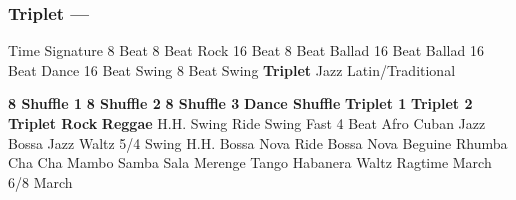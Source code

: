 \subsubsection[Triplet]{Triplet --- \UiKey{\II}\UiKey{\MET}}
Time Signature
8 Beat
8 Beat Rock
16 Beat
8 Beat Ballad
16 Beat Ballad
16 Beat Dance
16 Beat Swing
8 Beat Swing
\textbf{Triplet}
Jazz
Latin/Traditional





























\textbf{8 Shuffle 1}
\textbf{8 Shuffle 2}
\textbf{8 Shuffle 3}
\textbf{Dance Shuffle}
\textbf{Triplet 1}
\textbf{Triplet 2}
\textbf{Triplet Rock}
\textbf{Reggae}
H.H. Swing
Ride Swing
Fast 4 Beat
Afro Cuban
Jazz Bossa
Jazz Waltz
5/4 Swing
H.H. Bossa Nova
Ride Bossa Nova
Beguine
Rhumba
Cha Cha
Mambo
Samba
Sala
Merenge
Tango
Habanera
Waltz
Ragtime
March
6/8 March
